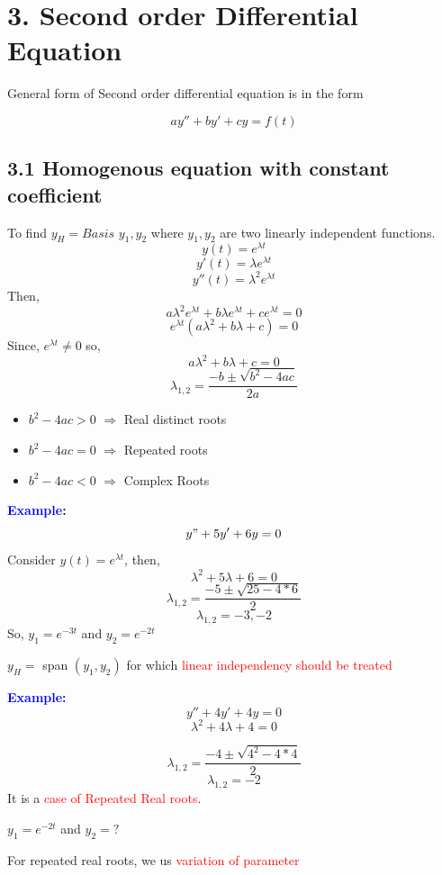 \documentclass[
  11pt,
]{article}
\providecommand{\tightlist}{%
  \setlength{\itemsep}{0pt}\setlength{\parskip}{0pt}}
\begin{document}
\newpage

\section{3. Second order Differential
Equation}\label{second-order-differential-equation}

General form of Second order differential equation is in the form

\[
ay''+by'+cy=f(t)
\]

\subsection{3.1 Homogenous equation with constant
coefficient}\label{homogenous-equation-with-constant-coefficient}

To find \(y_H = Basis\) \({y_1, y_2}\) where \(y_1, y_2\) are two
linearly independent functions. \[y(t)=e^{\lambda t}\]
\[y'(t)=\lambda e^{\lambda t}\] \[y''(t)=\lambda^2 e^{\lambda t}\] Then,
\[a\lambda^2 e^{\lambda t} + b\lambda e^{\lambda t} + c e^{\lambda t} = 0\]
\[e^{\lambda t}(a\lambda^2 +b\lambda + c) = 0\] Since,
\(e^{\lambda t} \neq 0\) so, \[a\lambda^2 +b\lambda + c= 0\]
\[\lambda_{1,2} = \frac{-b\pm\sqrt{b^2-4ac}}{2a}\]

\begin{itemize}
\tightlist
\item
  \(b^2-4ac>0\) \(\Longrightarrow\) Real distinct roots
\item
  \(b^2-4ac=0\) \(\Longrightarrow\) Repeated roots
\item
  \(b^2-4ac<0\) \(\Longrightarrow\) Complex Roots
\end{itemize}

\textbf{\textcolor{blue}{Example}:} \[y"+5y'+6y=0\] Consider
\(y(t)=e^{\lambda t}\), then, \[\lambda^2+5\lambda+6=0\]
\[\lambda_{1,2}=\frac{-5 \pm \sqrt{25-4*6}}{2}\] \[\lambda_{1,2}=-3,-2\]
So, \(y_1 = e^{-3t}\) and \(y_2 = e^{-2t}\)

\(y_H =\) span \((y_1, y_2)\) for which
\textcolor{red}{linear independency should be treated}

\textbf{\textcolor{blue}{Example:}} \[y''+4y'+4y=0\]
\[\lambda^2+4\lambda+4=0\]

\[\lambda_{1,2}=\frac{-4 \pm \sqrt{4^2-4*4}}{2}\] \[\lambda_{1,2} = -2\]
It is a \textcolor{red}{case of Repeated Real roots}.

\(y_1=e^{-2t}\) and \(y_2=?\)

For repeated real roots, we us \textcolor{red}{variation of parameter}
\end{document}
